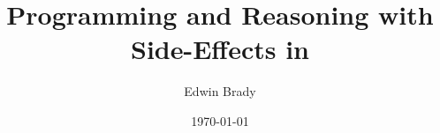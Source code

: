 \usepackage[l2tabu,orthodox]{nag}
\usepackage{fixltx2e}
\usepackage{babel}
\usepackage[iso]{isodate}
\usepackage[utf8]{inputenc}
\usepackage[T1]{fontenc}
\usepackage[protrusion=true, expansion=true]{microtype}
\usepackage[strict=true]{csquotes}
\usepackage{xspace}

\usepackage{mathpazo}
\usepackage[scaled=0.95]{helvet}
\usepackage{courier}

\usepackage{hyperref}
\usepackage[missing=0.9.14]{gitinfo}

\usepackage{multicol}
\usepackage{enumitem}

\usepackage{fpmacros}
\usepackage{idrislang}
\usepackage{comment}
\usepackage{graphicx}




\newcommand{\version}{\gitVtagn}
\newcommand{\effects}{\texttt{effects}}

\title{Programming and Reasoning with Side-Effects in \Idris{}}
\author{Edwin Brady}
\date{\origdate\today}



\maketitle
\tableofcontents
\newpage












\appendix




